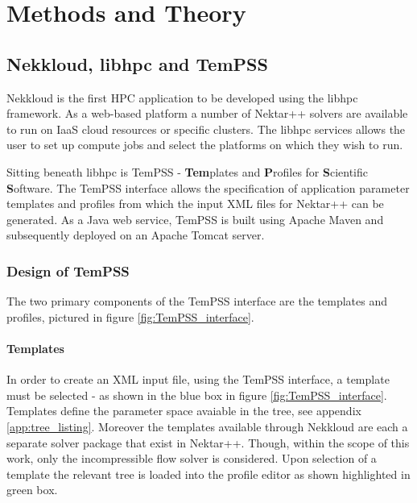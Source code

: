 \documentclass[11pt, a4paper]{report}
\begin{document}
\newpage
\chapter{Methods and Theory}

\section{Nekkloud, libhpc and TemPSS}
Nekkloud is the first HPC application to be developed using the libhpc framework. As a web-based platform a number of Nektar++ solvers are available to run on IaaS cloud resources or specific clusters. The libhpc services allows the user to set up compute jobs and select the platforms on which they wish to run.

Sitting beneath libhpc is TemPSS - \textbf{Tem}plates and \textbf{P}rofiles for \textbf{S}cientific \textbf{S}oftware. The TemPSS interface allows the specification of application parameter templates and profiles from which the input XML files for Nektar++ can be generated. As a Java web service, TemPSS is built using Apache Maven and subsequently deployed on an Apache Tomcat server.

\subsection{Design of TemPSS}
The two primary components of the TemPSS interface are the templates and profiles, pictured in figure \ref{fig:TemPSS_interface}.

\subsubsection{Templates}
In order to create an XML input file, using the TemPSS interface, a template must be selected - as shown in the \textcolor{myblue}{blue box} in figure \ref{fig:TemPSS_interface}. Templates define the parameter space avaiable in the tree, see appendix \ref{app:tree_listing}. Moreover the templates available through Nekkloud are each a separate solver package that exist in Nektar++. Though, within the scope of this work, only the incompressible flow solver is considered. Upon selection of a template the relevant tree is loaded into the profile editor as shown highlighted in \textcolor{mygreen}{green box}. 
\end{document}
